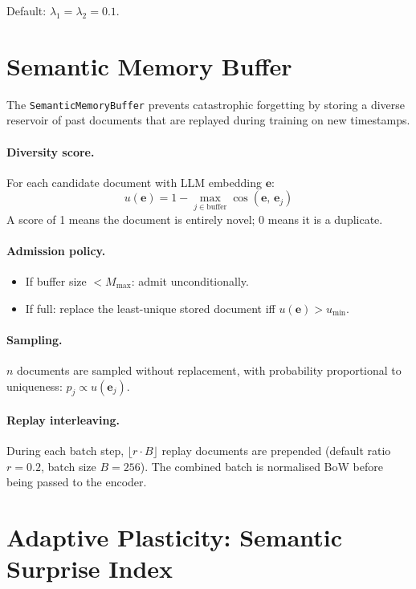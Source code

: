 \documentclass[11pt,a4paper]{article}
\begin{document}
Default: $\lambda_1 = \lambda_2 = 0.1$.

\section{Semantic Memory Buffer}

The \texttt{SemanticMemoryBuffer} prevents catastrophic forgetting by storing
a diverse reservoir of past documents that are replayed during training on new timestamps.

\paragraph{Diversity score.}
For each candidate document with LLM embedding $\mathbf{e}$:
\[
  u(\mathbf{e}) = 1 - \max_{j \in \text{buffer}} \cos(\mathbf{e},\, \mathbf{e}_j)
\]
A score of 1 means the document is entirely novel; 0 means it is a duplicate.

\paragraph{Admission policy.}
\begin{itemize}
  \item If buffer size $< M_{\max}$: admit unconditionally.
  \item If full: replace the least-unique stored document iff $u(\mathbf{e}) > u_{\min}$.
\end{itemize}

\paragraph{Sampling.}
$n$ documents are sampled without replacement, with probability proportional to uniqueness:
$p_j \propto u(\mathbf{e}_j)$.

\paragraph{Replay interleaving.}
During each batch step, $\lfloor r \cdot B \rfloor$ replay documents are prepended
(default ratio $r=0.2$, batch size $B=256$). The combined batch is normalised BoW
before being passed to the encoder.

\section{Adaptive Plasticity: Semantic Surprise Index}
\end{document}
